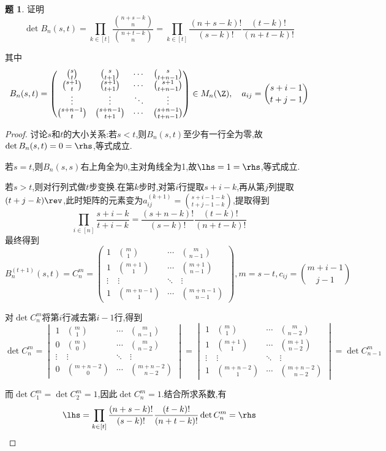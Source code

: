 \documentclass{article}
\theoremstyle{definition}
\newtheorem{exercise}{题}[section]
\begin{document}
\begin{exercise}
    证明$$\det B_n(s,t)=\prod_{k\in [t]}\frac{\binom{n+s-k}{n}}{\binom{n+t-k}{n}}=\prod_{k\in [t]}\frac{(n+s-k)!}{(s-k)!}\frac{(t-k)!}{(n+t-k)!}$$

    其中
    $$ B_n(s,t)=\begin{pmatrix}
    \binom{s}{t}&\binom{s}{t+1}&\cdots &\binom{s}{t+n-1}\\
    \binom{s+1}{t}&\binom{s+1}{t+1}&\cdots&\binom{s+1}{t+n-1}\\
    \vdots&\vdots&\ddots&\vdots\\
    \binom{s+n-1}{t}&\binom{s+n-1}{t+1}&\cdots&\binom{s+n-1}{t+n-1}
    \end{pmatrix}\in M_n(\Z),\quad a_{ij}=\binom{s+i-1}{t+j-1}$$
\end{exercise}
\begin{proof}
    讨论$s$和$t$的大小关系:若$s<t$,则$B_n(s,t)$至少有一行全为零,故$\det B_n(s,t)=0=\rhs$,等式成立.

    若$s=t$,则$B_n(s,s)$右上角全为0,主对角线全为1,故$\lhs=1=\rhs$,等式成立.

    若$s>t$,则对行列式做$t$步变换.在第$k$步时,对第$i$行提取$s+i-k$,再从第$j$列提取$(t+j-k)\rev$,此时矩阵的元素变为$ a^{(k+1)}_{ij}=\binom{s+i-1-k}{t+j-1-k}$,提取得到
    $$\prod_{i\in [n]}\frac{s+i-k}{t+i-k}=\frac{(s+n-k)!}{(s-k)!}\frac{(t-k)!}{(n+t-k)!}$$
    最终得到$$B^{(t+1)}_n(s,t)=C^m_n=\begin{pmatrix}
        1&\binom{m}{1}&\cdots &\binom{m}{n-1}\\
        1&\binom{m+1}{1}&\cdots&\binom{m+1}{n-1}\\
        \vdots&\vdots&\ddots&\vdots\\
        1&\binom{m+n-1}{1}&\cdots&\binom{m+n-1}{n-1}
    \end{pmatrix}, m=s-t, c_{ij}=\binom{m+i-1}{j-1}$$

    对$\det C_n^m$将第$i$行减去第$i-1$行,得到
    $$\det C^m_n=\begin{vmatrix}
        1&\binom{m}{1}&\cdots &\binom{m}{n-1}\\
        0&\binom{m}{0}&\cdots&\binom{m}{n-2}\\
        \vdots&\vdots&\ddots&\vdots\\
        0&\binom{m+n-2}{0}&\cdots&\binom{m+n-2}{n-2}
    \end{vmatrix}=\begin{vmatrix}
        1&\binom{m}{1}&\cdots &\binom{m}{n-2}\\
        1&\binom{m+1}{1}&\cdots&\binom{m+1}{n-2}\\
        \vdots&\vdots&\ddots&\vdots\\
        1&\binom{m+n-2}{1}&\cdots&\binom{m+n-2}{n-2}
    \end{vmatrix}=\det C^m_{n-1}$$

    而$\det C^m_1=\det C^m_2=1$,因此$\det C^m_n=1$.结合所求系数,有
    $$\lhs=\prod_{k\in [t]}\frac{(n+s-k)!}{(s-k)!}\frac{(t-k)!}{(n+t-k)!} \det C^m_n=\rhs$$
\end{proof}
\end{document}
